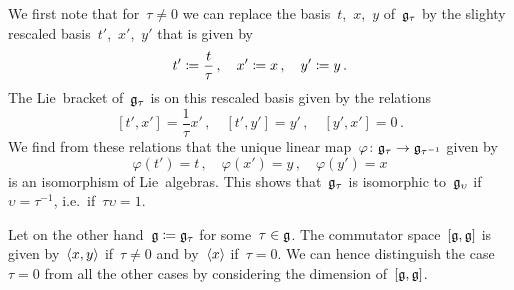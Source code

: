 \begin{example}
  We first note that for~$\tau \neq 0$ we can replace the basis~$t$,~$x$,~$y$ of~$\mathfrak{g}_\tau$ by the slighty rescaled basis~$t'$,~$x'$,~$y'$ that is given by
  \[
    t' \coloneqq \frac{t}{\tau} \,,
    \quad
    x' \coloneqq x \,,
    \quad
    y' \coloneqq y \,.
  \]
  The Lie~bracket of~$\mathfrak{g}_\tau$ is on this rescaled basis given by the relations
  \[
    [t', x'] = \frac{1}{\tau} x' \,,
    \quad
    [t', y'] = y' \,,
    \quad
    [y', x'] = 0 \,.
  \]
  We find from these relations that the unique linear map~$\varphi \colon \glie_{\tau} \to \glie_{\tau^{-1}}$ given by
  \[
    \varphi(t') = t \,,
    \quad
    \varphi(x') = y \,,
    \quad
    \varphi(y') = x
  \]
  is an isomorphism of Lie~algebras.
  This shows that~$\mathfrak{g}_{\tau}$ is isomorphic to~$\mathfrak{g}_{\upsilon}$ if~$\upsilon = \tau^{-1}$, i.e.\ if~$\tau \upsilon = 1$.
  
  Let on the other hand~$\mathfrak{g} \coloneqq \mathfrak{g}_\tau$ for some~$\tau \in \mathfrak{g}$.
  The commutator space~$[\mathfrak{g}, \mathfrak{g}]$ is given by~$\langle x, y\rangle$ if~$\tau \neq 0$ and by~$\langle x\rangle$ if~$\tau = 0$.
  We can hence distinguish the case~$\tau = 0$ from all the other cases by considering the dimension of~$[\mathfrak{g}, \mathfrak{g}]$.


\end{example}
